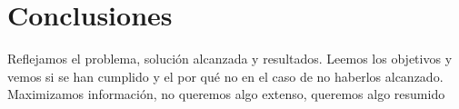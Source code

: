 \section{Conclusiones}
Reflejamos el problema, solución alcanzada y resultados.
Leemos los objetivos y vemos si se han cumplido y el por qué no en el caso de no haberlos alcanzado. 
Maximizamos información, no queremos algo extenso, queremos algo resumido
